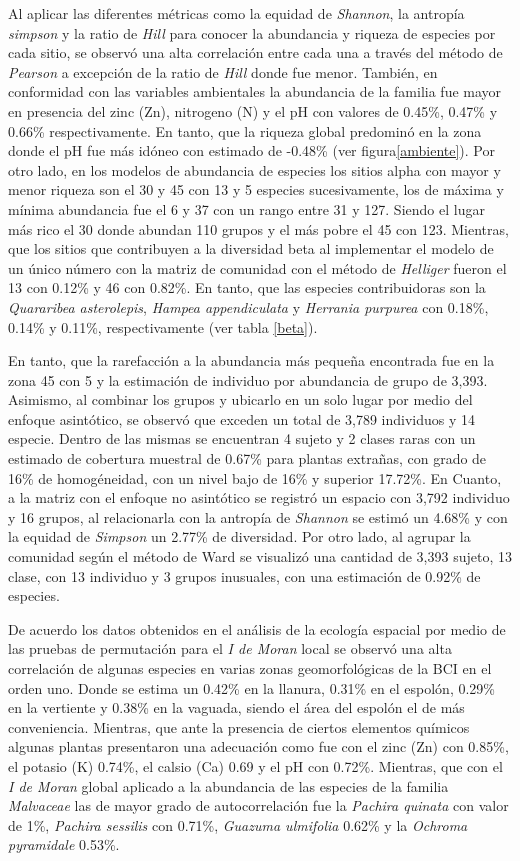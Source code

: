 \documentclass[11pt,]{article}
\begin{document}
Al aplicar las diferentes métricas como la equidad de \emph{Shannon}, la
antropía \emph{simpson} y la ratio de \emph{Hill} para conocer la
abundancia y riqueza de especies por cada sitio, se observó una alta
correlación entre cada una a través del método de \emph{Pearson} a
excepción de la ratio de \emph{Hill} donde fue menor. También, en
conformidad con las variables ambientales la abundancia de la familia
fue mayor en presencia del zinc (Zn), nitrogeno (N) y el pH con valores
de 0.45\%, 0.47\% y 0.66\% respectivamente. En tanto, que la riqueza
global predominó en la zona donde el pH fue más idóneo con estimado de
-0.48\% (ver figura\ref{ambiente}). Por otro lado, en los modelos de
abundancia de especies los sitios alpha con mayor y menor riqueza son el
30 y 45 con 13 y 5 especies sucesivamente, los de máxima y mínima
abundancia fue el 6 y 37 con un rango entre 31 y 127. Siendo el lugar
más rico el 30 donde abundan 110 grupos y el más pobre el 45 con 123.
Mientras, que los sitios que contribuyen a la diversidad beta al
implementar el modelo de un único número con la matriz de comunidad con
el método de \emph{Helliger} fueron el 13 con 0.12\% y 46 con 0.82\%. En
tanto, que las especies contribuidoras son la \emph{Quararibea
asterolepis}, \emph{Hampea appendiculata} y \emph{Herrania purpurea} con
0.18\%, 0.14\% y 0.11\%, respectivamente (ver tabla \ref{beta}).

En tanto, que la rarefacción a la abundancia más pequeña encontrada fue
en la zona 45 con 5 y la estimación de individuo por abundancia de grupo
de 3,393. Asimismo, al combinar los grupos y ubicarlo en un solo lugar
por medio del enfoque asintótico, se observó que exceden un total de
3,789 individuos y 14 especie. Dentro de las mismas se encuentran 4
sujeto y 2 clases raras con un estimado de cobertura muestral de 0.67\%
para plantas extrañas, con grado de 16\% de homogéneidad, con un nivel
bajo de 16\% y superior 17.72\%. En Cuanto, a la matriz con el enfoque
no asintótico se registró un espacio con 3,792 individuo y 16 grupos, al
relacionarla con la antropía de \emph{Shannon} se estimó un 4.68\% y con
la equidad de \emph{Simpson} un 2.77\% de diversidad. Por otro lado, al
agrupar la comunidad según el método de Ward se visualizó una cantidad
de 3,393 sujeto, 13 clase, con 13 individuo y 3 grupos inusuales, con
una estimación de 0.92\% de especies.

De acuerdo los datos obtenidos en el análisis de la ecología espacial
por medio de las pruebas de permutación para el \emph{I de Moran} local
se observó una alta correlación de algunas especies en varias zonas
geomorfológicas de la BCI en el orden uno. Donde se estima un 0.42\% en
la llanura, 0.31\% en el espolón, 0.29\% en la vertiente y 0.38\% en la
vaguada, siendo el área del espolón el de más conveniencia. Mientras,
que ante la presencia de ciertos elementos químicos algunas plantas
presentaron una adecuación como fue con el zinc (Zn) con 0.85\%, el
potasio (K) 0.74\%, el calsio (Ca) 0.69 y el pH con 0.72\%. Mientras,
que con el \emph{I de Moran} global aplicado a la abundancia de las
especies de la familia \emph{Malvaceae} las de mayor grado de
autocorrelación fue la \emph{Pachira quinata} con valor de 1\%,
\emph{Pachira sessilis} con 0.71\%, \emph{Guazuma ulmifolia} 0.62\% y la
\emph{Ochroma pyramidale} 0.53\%.
\end{document}
